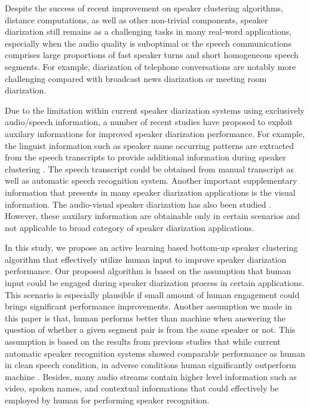 \documentclass[journal,10pt]{IEEEtran}
\begin{document}
Despite the success of recent improvement on speaker clustering algorithms, distance computations, as well as other non-trivial components, speaker diarization still remains as a challenging tasks in many real-word applications, especially when the audio quality is suboptimal or the speech communications comprises large proportions of fast speaker turns and short homogeneous speech segments. For example, diarization of telephone conversations are notably more challenging compared with broadcast news diarization or meeting room diarization. 

Due to the limitation within current speaker diarization systems using exclusively audio/speech information, a number of recent studies have proposed to exploit auxilary informations for improved speaker diarization performance. For example, the linguist information such as speaker name occurring patterns are extracted from the speech transcripts to provide additional information during speaker clustering \cite{canseco2004speaker}. The speech transcript could be obtained from manual transcript as well as automatic speech recognition system. Another important supplementary information that presents in many speaker diarization applications is the visual information. The audio-visual speaker diarization has also been studied \cite{friedland2009multi,noulas2012multimodal}. However, these auxilary information are obtainable only in certain scenarios and not applicable to broad category of speaker diarization applications.

In this study, we propose an active learning based bottom-up speaker clustering algorithm that effectively utilize human input to improve speaker diarization performance. Our proposed algorithm is based on the assumption that human input could be engaged during speaker diarization process in certain applications. This scenario is especially plausible if small amount of human engagement could brings significant performance improvements. Another assumption we made in this paper is that, human performs better than machine when answering the question of whether a given segment pair is from the same speaker or not. This assumption is based on the results from previous studies that while current automatic speaker recognition systems showed comparable performance as human in clean speech condition, in adverse conditions human significantly outperform machine \cite{wenndt2012machine,schmidt1998human}. Besides, many audio streams contain higher level information such as video, spoken names, and contextual informations that could effectively be employed by human for performing speaker recognition.
\end{document}

